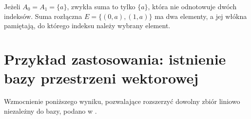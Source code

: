 \begin{przyklad}
\label{ex:choice-disjoint-index}
Jeżeli $A_0=A_1=\{a\}$,
zwykła suma to tylko $\{a\}$,
która nie odnotowuje dwóch indeksów.
Suma rozłączna
$E=\{(0,a),(1,a)\}$ ma dwa elementy,
a jej włókna pamiętają, do którego
indeksu należy wybrany element.
\end{przyklad}

\section{Przykład zastosowania: istnienie bazy przestrzeni wektorowej}

Wzmocnienie poniższego wyniku, pozwalające rozszerzyć dowolny zbiór liniowo niezależny do bazy, podano w .

